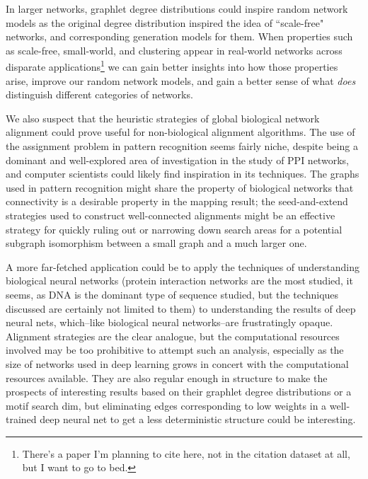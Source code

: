 \documentclass[12pt]{thesis}
\theoremstyle{plain}
\theoremstyle{definition}
\theoremstyle{remark}
\begin{document}
In larger networks, graphlet degree distributions could inspire random network models as the original degree distribution inspired the idea of ``scale-free" networks, and corresponding generation models for them. When properties such as scale-free, small-world, and clustering appear in real-world networks across disparate applications\footnote{There's a paper I'm planning to cite here, not in the citation dataset at all, but I want to go to bed.} we can gain better insights into how those properties arise, improve our random network models, and gain a better sense of what \textit{does} distinguish different categories of networks.

We also suspect that the heuristic strategies of global biological network alignment could prove useful for non-biological alignment algorithms. The use of the assignment problem in pattern recognition seems fairly niche, despite being a dominant and well-explored area of investigation in the study of PPI networks, and computer scientists could likely find inspiration in its techniques. The graphs used in pattern recognition might share the property of biological networks that connectivity is a desirable property in the mapping result; the seed-and-extend strategies used to construct well-connected alignments might be an effective strategy for quickly ruling out or narrowing down search areas for a potential subgraph isomorphism between a small graph and a much larger one.

A more far-fetched application could be to apply the techniques of understanding biological neural networks (protein interaction networks are the most studied, it seems, as DNA is the dominant type of sequence studied, but the techniques discussed are certainly not limited to them) to understanding the results of deep neural nets, which--like biological neural networks--are frustratingly opaque. Alignment strategies are the clear analogue, but the computational resources involved may be too prohibitive to attempt such an analysis, especially as the size of networks used in deep learning grows in concert with the computational resources available. They are also regular enough in structure to make the prospects of interesting results based on their graphlet degree distributions or a motif search dim, but eliminating edges corresponding to low weights in a well-trained deep neural net to get a less deterministic structure could be interesting.
\end{document}
